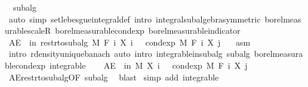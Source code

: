 \begin{isabellebody}
\ {\isacharasterisk}{\kern0pt}\ subalg\ \isamarkupfalse%
\ {\isacharparenleft}{\kern0pt}auto\ simp{\isacharcolon}{\kern0pt}\ set{\isacharunderscore}{\kern0pt}lebesgue{\isacharunderscore}{\kern0pt}integral{\isacharunderscore}{\kern0pt}def\ intro{\isacharbang}{\kern0pt}{\isacharcolon}{\kern0pt}\ integral{\isacharunderscore}{\kern0pt}subalgebra{}{\isacharbrackleft}{\kern0pt}symmetric{\isacharbrackright}{\kern0pt}\ borel{\isacharunderscore}{\kern0pt}measurable{\isacharunderscore}{\kern0pt}scaleR\ borel{\isacharunderscore}{\kern0pt}measurable{\isacharunderscore}{\kern0pt}cond{\isacharunderscore}{\kern0pt}exp\ borel{\isacharunderscore}{\kern0pt}measurable{\isacharunderscore}{\kern0pt}indicator{\isacharparenright}{\kern0pt}\isanewline
\ \ \isacommand{{\isacharbraceright}{\kern0pt}}\isamarkupfalse%
\isanewline
\ \ \isamarkupfalse%
\ {\isachardoublequoteopen}AE\ {\isasymxi}\ in\ restr{\isacharunderscore}{\kern0pt}to{\isacharunderscore}{\kern0pt}subalg\ M\ {\isacharparenleft}{\kern0pt}F\ i{\isacharparenright}{\kern0pt}{\isachardot}{\kern0pt}\ X\ i\ {\isasymxi}\ {\isacharequal}{\kern0pt}\ cond{\isacharunderscore}{\kern0pt}exp\ M\ {\isacharparenleft}{\kern0pt}F\ i{\isacharparenright}{\kern0pt}\ {\isacharparenleft}{\kern0pt}X\ j{\isacharparenright}{\kern0pt}\ {\isasymxi}{\isachardoublequoteclose}\ \isamarkupfalse%
\ asm\ \isamarkupfalse%
\ {\isacharparenleft}{\kern0pt}intro\ r{\isachardot}{\kern0pt}density{\isacharunderscore}{\kern0pt}unique{\isacharunderscore}{\kern0pt}banach{\isacharcomma}{\kern0pt}\ auto\ intro{\isacharcolon}{\kern0pt}\ integrable{\isacharunderscore}{\kern0pt}in{\isacharunderscore}{\kern0pt}subalg\ subalg\ borel{\isacharunderscore}{\kern0pt}measurable{\isacharunderscore}{\kern0pt}cond{\isacharunderscore}{\kern0pt}exp\ integrable{\isacharparenright}{\kern0pt}\isanewline
\ \ \isamarkupfalse%
\ {\isachardoublequoteopen}AE\ {\isasymxi}\ in\ M{\isachardot}{\kern0pt}\ X\ i\ {\isasymxi}\ {\isacharequal}{\kern0pt}\ cond{\isacharunderscore}{\kern0pt}exp\ M\ {\isacharparenleft}{\kern0pt}F\ i{\isacharparenright}{\kern0pt}\ {\isacharparenleft}{\kern0pt}X\ j{\isacharparenright}{\kern0pt}\ {\isasymxi}{\isachardoublequoteclose}\ \isamarkupfalse%
\ AE{\isacharunderscore}{\kern0pt}restr{\isacharunderscore}{\kern0pt}to{\isacharunderscore}{\kern0pt}subalg{\isacharbrackleft}{\kern0pt}OF\ subalg{\isacharbrackright}{\kern0pt}\ \isamarkupfalse%
\ blast\isanewline
{}\isamarkupfalse%
\ {\isacharparenleft}{\kern0pt}simp\ add{\isacharcolon}{\kern0pt}\ integrable{\isacharparenright}{\kern0pt}%

\end{isabellebody}
